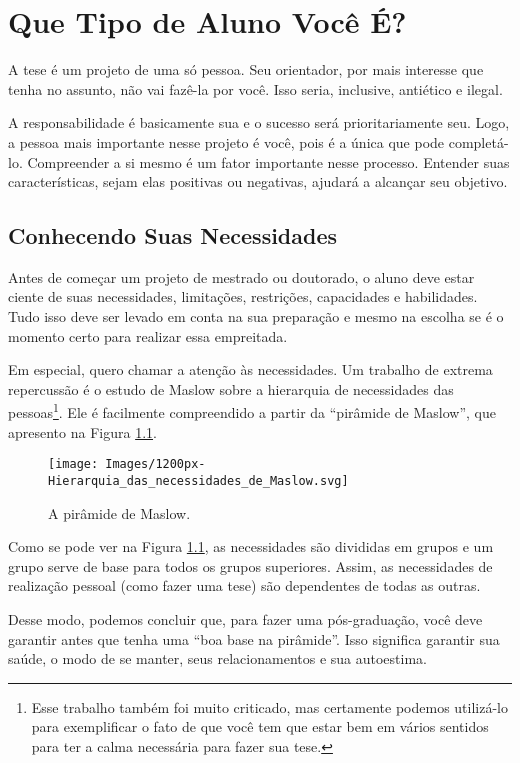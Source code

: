 \chapter{Que Tipo de Aluno Você É?}

A tese é um projeto de uma só pessoa. Seu orientador, por mais interesse que tenha no assunto, não vai fazê-la por você. Isso seria, inclusive, antiético e ilegal.


A responsabilidade é basicamente sua e o sucesso será prioritariamente seu. Logo, a pessoa mais importante nesse projeto é você, pois é a única que pode completá-lo. Compreender a si mesmo é um fator importante nesse processo. Entender suas características, sejam elas positivas ou negativas, ajudará a alcançar seu objetivo.



\section{Conhecendo Suas Necessidades}

Antes de começar um projeto de mestrado ou doutorado, o aluno deve estar ciente de suas necessidades, limitações, restrições, capacidades e habilidades. Tudo isso deve ser levado em conta na sua preparação e mesmo na escolha se é o momento certo para realizar essa empreitada.

Em especial, quero chamar a atenção às necessidades. Um trabalho de extrema repercussão é o estudo de Maslow  sobre a hierarquia de necessidades das pessoas\footnote{Esse trabalho também foi muito criticado, mas certamente podemos utilizá-lo para exemplificar o fato de que você tem que estar bem em vários sentidos para ter a calma necessária para fazer sua tese.}. Ele é facilmente compreendido a partir da “pirâmide de Maslow”, que apresento na Figura \ref{fig:maslow}.

\begin{figure}
	\centering
	\texttt{[image: Images/1200px-Hierarquia\_das\_necessidades\_de\_Maslow.svg]}
	\caption{A pirâmide de Maslow.}
	\label{fig:maslow}
\end{figure}


Como se pode ver na Figura \ref{fig:maslow}, as necessidades são divididas em grupos e um grupo serve de base para todos os grupos superiores. Assim, as necessidades de realização pessoal (como fazer uma tese) são dependentes de todas as outras. 

Desse modo, podemos concluir que, para fazer uma pós-graduação, você deve garantir antes que tenha uma “boa base na pirâmide”. Isso significa garantir sua saúde, o modo de se manter, seus relacionamentos e sua autoestima.

